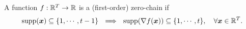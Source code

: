 \documentclass{article}
\begin{document}






\begin{dfn}
A function $f: {\mathbb{R}}^T\rightarrow {\mathbb{R}}$ is a (first-order) zero-chain if 
\begin{align*}
    {\rm supp}({\bm{x}}) \subseteq \{1,\cdots,t-1 \} ~~ \Longrightarrow ~~ {\rm supp}(\nabla f({\bm{x}})) \subseteq \{1,\cdots,t \}, \quad \forall {\bm{x}} \in {\mathbb{R}}^T.
\end{align*}
\end{dfn}
\end{document}
